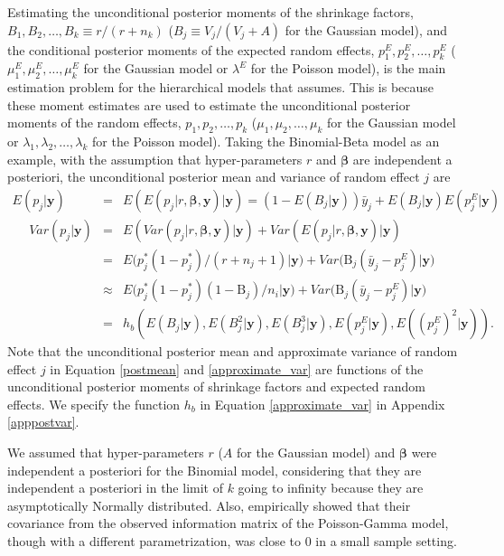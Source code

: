 \documentclass[article]{jss}
\begin{document}
Estimating the unconditional posterior moments of the shrinkage factors, $B_1, B_2, \ldots, B_k\equiv r/(r+n_k)$ ($B_j\equiv V_j/(V_j+A)$ for the Gaussian model), and the conditional posterior moments of the expected random effects, $p^E_1, p^E_2, \ldots, p^E_k$ ($\mu^E_1, \mu^E_2, \ldots, \mu^E_k$ for the Gaussian model or $\lambda^E$ for the Poisson model), is the main estimation problem for the hierarchical models that  assumes. This is because these moment estimates are used to estimate the unconditional posterior moments of the random effects, $p_1, p_2, \ldots, p_k$ ($\mu_1, \mu_2, \ldots, \mu_k$ for the Gaussian model or $\lambda_1, \lambda_2, \ldots, \lambda_k$ for the Poisson model). Taking the Binomial-Beta model as an example, with the assumption that hyper-parameters $r$ and $\boldsymbol{\beta}$ are independent a posteriori, the unconditional posterior mean and variance of random effect $j$ are
\begin{eqnarray}
E(p_{j}\vert \boldsymbol{y}) &=&E(E(p_{j}\vert r, \boldsymbol{\beta}, \boldsymbol{y})\vert\boldsymbol{y})=(1-E(B_j\vert\boldsymbol{y}))\bar{y}_j + E(B_j\vert  \boldsymbol{y})E(p^E_{j}\vert  \boldsymbol{y})\label{postmean} \\
~~~~~~Var(p_{j}\vert \boldsymbol{y}) &=&  E(Var(p_{j}\vert r, \boldsymbol{\beta}, \boldsymbol{y})\vert \boldsymbol{y})+Var(E(p_{j}\vert r, \boldsymbol{\beta},\boldsymbol{y})\vert \boldsymbol{y})\label{postvar}\\
&=& E\big(p^{\ast}_{j}(1-p^{\ast}_{j})/ (r+n_{j}+1)\vert  \boldsymbol{y}\big)+Var\big(\textrm{B}_{j}(\bar{y}_{j}-p^E_{j})\vert \boldsymbol{y}\big) \\
&\approx&E\big(p^{\ast}_{j}(1-p^{\ast}_{j})(1-\textrm{B}_{j})/n_{i}\vert \boldsymbol{y}\big)+Var\big(\textrm{B}_{j}(\bar{y}_{j}-p^E_{j})\vert \boldsymbol{y}\big)\\
&=&h_b(E(B_j\vert\boldsymbol{y}), E(B^2_j\vert\boldsymbol{y}), E(B^3_j\vert\boldsymbol{y}),  E(p^E_{j}\vert\boldsymbol{y}), E((p^E_{j})^2\vert\boldsymbol{y})).\label{approximate_var}
\end{eqnarray}
Note that the unconditional posterior mean and approximate variance of random effect $j$ in Equation \ref{postmean}  and \ref{approximate_var}  are functions of the unconditional posterior moments of shrinkage factors and expected random effects. We specify the function $h_b$ in Equation \ref{approximate_var} in Appendix \ref{apppostvar}.  

We assumed that hyper-parameters $r$ ($A$ for the Gaussian model) and  $\boldsymbol{\beta}$ were independent a posteriori for the Binomial model, considering that they are independent a posteriori in the limit of $k$ going to infinity  because they are asymptotically Normally distributed. Also, \cite{morris1997}  empirically showed that their covariance from the observed information matrix of the Poisson-Gamma model, though with a different parametrization, was close to 0 in a small sample setting. 
\end{document}
